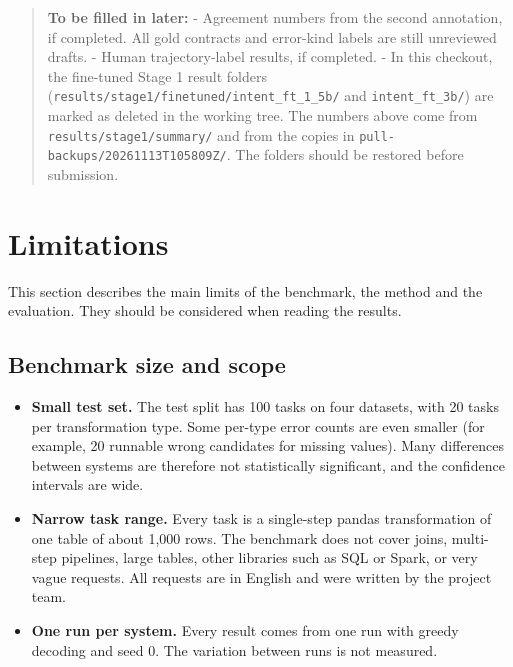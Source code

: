 \documentclass[11pt]{article}
\providecommand{\tightlist}{\setlength{\itemsep}{0pt}\setlength{\parskip}{0pt}}
\begin{document}
\begin{quote}
\textbf{To be filled in later:} - Agreement numbers from the second
annotation, if completed. All gold contracts and error-kind labels are
still unreviewed drafts. - Human trajectory-label results, if completed.
- In this checkout, the fine-tuned Stage 1 result folders
(\texttt{results/\allowbreak{}stage1/\allowbreak{}finetuned/\allowbreak{}intent\_\allowbreak{}ft\_\allowbreak{}1\_\allowbreak{}5b/\allowbreak{}}
and \texttt{intent\_\allowbreak{}ft\_\allowbreak{}3b/\allowbreak{}}) are
marked as deleted in the working tree. The numbers above come from
\texttt{results/\allowbreak{}stage1/\allowbreak{}summary/\allowbreak{}}
and from the copies in
\texttt{pull-backups/\allowbreak{}20261113T105809Z/\allowbreak{}}. The
folders should be restored before submission.
\end{quote}

\section{Limitations}

This section describes the main limits of the benchmark, the method and
the evaluation. They should be considered when reading the results.

\subsection{Benchmark size and scope}

\begin{itemize}
\tightlist
\item
  \textbf{Small test set.} The test split has 100 tasks on four
  datasets, with 20 tasks per transformation type. Some per-type error
  counts are even smaller (for example, 20 runnable wrong candidates for
  missing values). Many differences between systems are therefore not
  statistically significant, and the confidence intervals are wide.
\item
  \textbf{Narrow task range.} Every task is a single-step pandas
  transformation of one table of about 1,000 rows. The benchmark does
  not cover joins, multi-step pipelines, large tables, other libraries
  such as SQL or Spark, or very vague requests. All requests are in
  English and were written by the project team.
\item
  \textbf{One run per system.} Every result comes from one run with
  greedy decoding and seed 0. The variation between runs is not
  measured.
\end{itemize}
\end{document}

